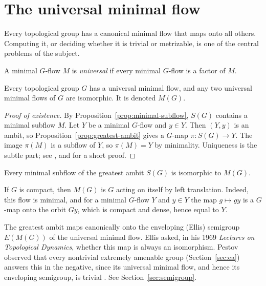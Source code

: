 \section{The universal minimal flow}\label{sec:umf}

Every topological group has a canonical minimal flow that maps onto all
others. Computing it, or deciding whether it is trivial or metrizable, is one
of the central problems of the subject.

\begin{definition}\label{def:umf}
A minimal $G$-flow $M$ is \emph{universal} if every minimal $G$-flow is a
factor of $M$.
\end{definition}

\begin{theorem}\label{thm:ellis}
Every topological group $G$ has a universal minimal flow, and any two
universal minimal flows of $G$ are isomorphic. It is denoted $M(G)$.
\end{theorem}

\begin{proof}[Proof of existence]
By Proposition~\ref{prop:minimal-subflow}, $S(G)$ contains a minimal subflow
$M$. Let $Y$ be a minimal $G$-flow and $y\in Y$. Then $(Y,y)$ is an ambit, so
Proposition~\ref{prop:greatest-ambit} gives a $G$-map $\pi\colon S(G)\to Y$.
The image $\pi(M)$ is a subflow of $Y$, so $\pi(M)=Y$ by minimality.
Uniqueness is the subtle part; see \cite{Ellis1960}, and \cite{GutmanLi2013}
for a short proof.
\end{proof}

\begin{corollary}\label{cor:umf-in-ambit}
Every minimal subflow of the greatest ambit $S(G)$ is isomorphic to $M(G)$.
\end{corollary}

\begin{example}\label{ex:umf-compact}
If $G$ is compact, then $M(G)$ is $G$ acting on itself by left translation.
Indeed, this flow is minimal, and for a minimal $G$-flow $Y$ and $y\in Y$ the
map $g\mapsto gy$ is a $G$-map onto the orbit $Gy$, which is compact and dense,
hence equal to $Y$.
\end{example}

\begin{remark}\label{rem:ellis-problem}
The greatest ambit maps canonically onto the enveloping (Ellis) semigroup
$E(M(G))$ of the universal minimal flow. Ellis asked, in his 1969
\emph{Lectures on Topological Dynamics}, whether this map is always an
isomorphism. Pestov observed that every nontrivial extremely amenable group
(Section~\ref{sec:ea}) answers this in the negative, since its universal
minimal flow, and hence its enveloping semigroup, is trivial
\cite{Pestov1998}. See Section~\ref{sec:semigroup}.
\end{remark}
